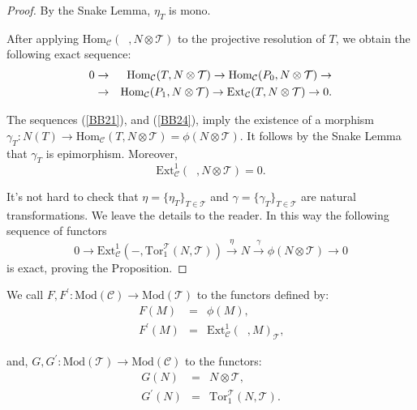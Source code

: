 \documentclass{amsart}
\theoremstyle{plain}
\numberwithin{equation}{section}
\begin{document}
\begin{proof}
By the Snake Lemma, $\eta _{T}$ is mono.

After applying $\mathrm{Hom}_{\mathcal{C}}(\;\;,N\otimes \mathcal{T})$ to
the projective resolution of $T$, we obtain the following exact sequence:
\begin{eqnarray}
0 &\rightarrow &\mathrm{Hom}_{\mathcal{C}}(T,N\otimes \mathcal{T})\rightarrow \mathrm{Hom}_{\mathcal{C}}(P_{0},N\otimes \mathcal{T})\rightarrow  \label{BB24} \\
&\rightarrow &\mathrm{Hom}_{\mathcal{C}}(P_{1},N\otimes \mathcal{T})\rightarrow \mathrm{Ext}_{\mathcal{C}}(T,N\otimes \mathcal{T})\rightarrow 0\text{.}  \notag
\end{eqnarray}

The sequences (\ref{BB21}), and (\ref{BB24}), imply the existence of a
morphism $\gamma _{T}:N(T)\rightarrow \mathrm{Hom}_{\mathcal{C}}(T,N\otimes
\mathcal{T})=\phi (N\otimes \mathcal{T})$. It follows by the Snake Lemma
that $\gamma _{T}$ is epimorphism. Moreover,
\begin{equation}  \label{BBI}
\mathrm{Ext}_{\mathcal{C}}^{1}(\;\;,N\otimes \mathcal{T})=0\text{.}
\end{equation}

It's not hard to check that $\eta =\{\eta _{T}\}_{T\in \mathcal{T}}$ and $\gamma =\{\gamma _{T}\}_{T\in \mathcal{T}}$ are natural transformations. We
leave the details to the reader. In this way the following sequence of
functors
\begin{equation*}
0\rightarrow \mathrm{Ext}_{\mathcal{C}}^{1}(-,\mathrm{Tor}_{1}^{\mathcal{T}}(N,\mathcal{T}))\xrightarrow{\eta}N\xrightarrow {\gamma}\phi (N\otimes
\mathcal{T})\rightarrow 0
\end{equation*}is exact, proving the Proposition.
\end{proof}

We call $F,F^{\prime }:\mathrm{\mathrm{Mod}}(\mathcal{C})\rightarrow \mathrm{\mathrm{Mod}}(\mathcal{T})$ to the functors defined by:
\begin{eqnarray*}
F(M) &=&\phi (M)\text{,} \\
F^{\prime }(M) &=&\mathrm{Ext}_{\mathcal{C}}^{1}(\;\;,M)_{\mathcal{T}}\text{,}
\end{eqnarray*}

and, $G,G^{\prime }:\mathrm{\mathrm{Mod}}(\mathcal{T})\rightarrow \mathrm{\mathrm{Mod}}(\mathcal{C})$ to the functors:\begin{eqnarray*}
G(N) &=&N\otimes \mathcal{T}\text{,} \\
G^{\prime }(N) &=&\mathrm{Tor}_{1}^{\mathcal{T}}(N,\mathcal{T})\text{.}
\end{eqnarray*}
\end{document}
